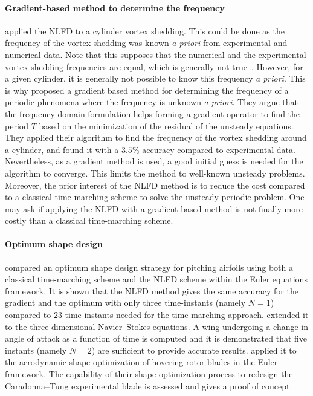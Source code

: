 \paragraph{Gradient-based method to determine the frequency}
\citet{McMullen2001} applied the NLFD to a cylinder
vortex shedding. This could be done as the frequency of the
vortex shedding was known \emph{a priori} from experimental
and numerical data. Note that this supposes that the
numerical and the experimental vortex shedding frequencies
are equal, which is generally not true~\cite{Kato1991}.
However, for a given cylinder, it is generally not
possible to know this frequency \emph{a priori}. This is why
\citet{McMullen2002, McMullen2006a}
proposed a gradient based method for determining the frequency
of a periodic phenomena where the frequency is unknown
\emph{a priori}. They argue that the frequency domain formulation
helps forming a gradient operator to find the period $T$ based
on the minimization of the residual of the unsteady equations.
They applied their algorithm to find the frequency of the vortex
shedding around a cylinder, and found it with a $3.5\%$ accuracy
compared to experimental data. Nevertheless, as a gradient method is 
used, a good initial guess is needed for the algorithm to
converge. This limits the method to well-known unsteady
problems. Moreover, the prior interest of the NLFD method is
to reduce the cost compared to a classical time-marching scheme
to solve the unsteady periodic problem. One may ask
if applying the NLFD with a gradient based method is not finally
more costly than a classical time-marching scheme.

\paragraph{Optimum shape design}
\citet{Nadarajah2003} compared an optimum shape design 
strategy for pitching airfoils 
using both a classical time-marching scheme
and the NLFD scheme within the Euler equations
framework. It is shown that the NLFD method
gives the same accuracy for the gradient and the optimum with only 
three time-instants (namely $N=1$)
compared to $23$ time-instants needed for 
the time-marching approach.
\citet{Nadarajah2007} extended it
to the three-dimensional Navier--Stokes equations.
A wing undergoing a change 
in angle of attack as a function of time is computed and
it is demonstrated that
five instants (namely $N=2$) are sufficient to provide
accurate results.
\citet{Tatossian2011} applied it
to the aerodynamic shape optimization of hovering rotor blades
in the Euler framework.
The capability of 
their shape optimization process
to redesign the Caradonna–Tung experimental 
blade is assessed and gives a proof
of concept.

